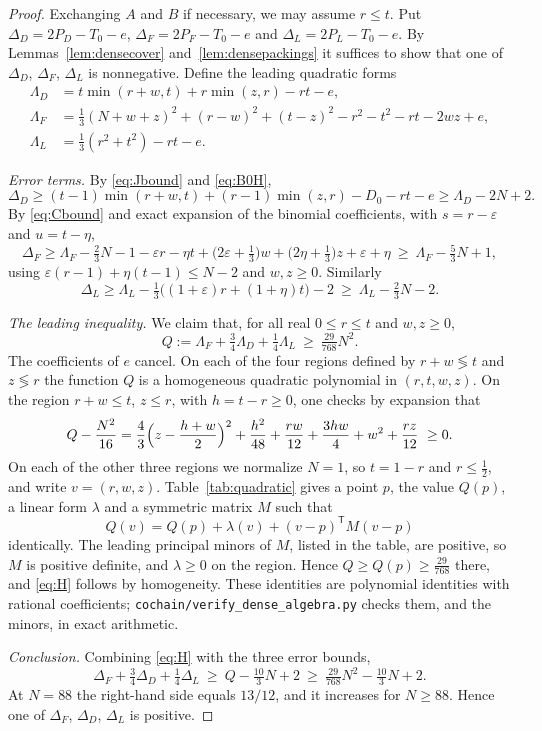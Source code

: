 \documentclass{amsart}
\theoremstyle{definition}
\theoremstyle{remark}
\numberwithin{equation}{section}
\numberwithin{table}{section}
\begin{document}
\begin{proof}
Exchanging $A$ and $B$ if necessary, we may assume $r\le t$. Put $\Delta_D=2P_D-T_0-e$, $\Delta_F=2P_F-T_0-e$ and $\Delta_L=2P_L-T_0-e$. By Lemmas~\ref{lem:densecover} and~\ref{lem:densepackings} it suffices to show that one of $\Delta_D$, $\Delta_F$, $\Delta_L$ is nonnegative. Define the leading quadratic forms
\begin{align*}
\Lambda_D&=t\min(r+w,t)+r\min(z,r)-rt-e,\\
\Lambda_F&=\tfrac13(N+w+z)^2+(r-w)^2+(t-z)^2-r^2-t^2-rt-2wz+e,\\
\Lambda_L&=\tfrac13(r^2+t^2)-rt-e .
\end{align*}

\emph{Error terms.} By \eqref{eq:Jbound} and \eqref{eq:B0H},
\[
\Delta_D\ge(t-1)\min(r+w,t)+(r-1)\min(z,r)-D_0-rt-e\ge \Lambda_D-2N+2 .
\]
By \eqref{eq:Cbound} and exact expansion of the binomial coefficients, with $s=r-\varepsilon$ and $u=t-\eta$,
\[
\Delta_F\ge \Lambda_F-\tfrac23N-1-\varepsilon r-\eta t+\bigl(2\varepsilon+\tfrac13\bigr)w+\bigl(2\eta+\tfrac13\bigr)z+\varepsilon+\eta\ \ge\ \Lambda_F-\tfrac53N+1,
\]
using $\varepsilon(r-1)+\eta(t-1)\le N-2$ and $w,z\ge0$. Similarly
\[
\Delta_L\ge \Lambda_L-\tfrac13\bigl((1+\varepsilon)r+(1+\eta)t\bigr)-2\ \ge\ \Lambda_L-\tfrac23N-2 .
\]

\emph{The leading inequality.} We claim that, for all real $0\le r\le t$ and $w,z\ge0$,
\begin{equation}\label{eq:H}
Q:=\Lambda_F+\tfrac34\Lambda_D+\tfrac14\Lambda_L\ \ge\ \tfrac{29}{768}N^2 .
\end{equation}
The coefficients of $e$ cancel. On each of the four regions defined by $r+w\lessgtr t$ and $z\lessgtr r$ the function $Q$ is a homogeneous quadratic polynomial in $(r,t,w,z)$. On the region $r+w\le t$, $z\le r$, with $h=t-r\ge0$, one checks by expansion that
\[
Q-\frac{N^2}{16}=\frac43\Bigl(z-\frac{h+w}2\Bigr)^2+\frac{h^2}{48}+\frac{rw}{12}+\frac{3hw}4+w^2+\frac{rz}{12}\ \ge0 .
\]
On each of the other three regions we normalize $N=1$, so $t=1-r$ and $r\le\frac12$, and write $v=(r,w,z)$. Table~\ref{tab:quadratic} gives a point $p$, the value $Q(p)$, a linear form $\lambda$ and a symmetric matrix $M$ such that
\[
Q(v)=Q(p)+\lambda(v)+(v-p)^{\mathsf T}M(v-p)
\]
identically. The leading principal minors of $M$, listed in the table, are positive, so $M$ is positive definite, and $\lambda\ge0$ on the region. Hence $Q\ge Q(p)\ge\frac{29}{768}$ there, and \eqref{eq:H} follows by homogeneity. These identities are polynomial identities with rational coefficients; \texttt{cochain/verify\_dense\_algebra.py} checks them, and the minors, in exact arithmetic.

\emph{Conclusion.} Combining \eqref{eq:H} with the three error bounds,
\[
\Delta_F+\tfrac34\Delta_D+\tfrac14\Delta_L\ \ge\ Q-\tfrac{10}3N+2\ \ge\ \tfrac{29}{768}N^2-\tfrac{10}3N+2 .
\]
At $N=88$ the right-hand side equals $13/12$, and it increases for $N\ge88$. Hence one of $\Delta_F$, $\Delta_D$, $\Delta_L$ is positive.
\end{proof}
\end{document}
